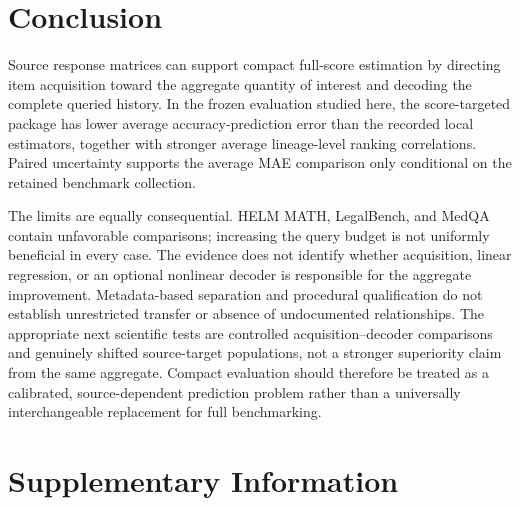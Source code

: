 \documentclass{article}
\begin{document}
\section{Conclusion}
Source response matrices can support compact full-score estimation by directing item acquisition toward the aggregate quantity of interest and decoding the complete queried history. In the frozen evaluation studied here, the score-targeted package has lower average accuracy-prediction error than the recorded local estimators, together with stronger average lineage-level ranking correlations. Paired uncertainty supports the average MAE comparison only conditional on the retained benchmark collection.

The limits are equally consequential. HELM MATH, LegalBench, and MedQA contain unfavorable comparisons; increasing the query budget is not uniformly beneficial in every case. The evidence does not identify whether acquisition, linear regression, or an optional nonlinear decoder is responsible for the aggregate improvement. Metadata-based separation and procedural qualification do not establish unrestricted transfer or absence of undocumented relationships. The appropriate next scientific tests are controlled acquisition--decoder comparisons and genuinely shifted source-target populations, not a stronger superiority claim from the same aggregate. Compact evaluation should therefore be treated as a calibrated, source-dependent prediction problem rather than a universally interchangeable replacement for full benchmarking.

\clearpage


\clearpage
\appendix
\section{Supplementary Information}
\end{document}
